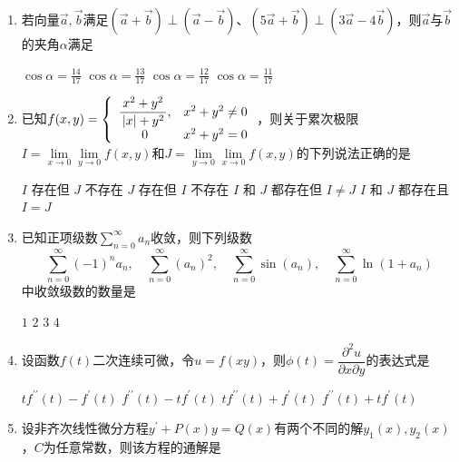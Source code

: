 \begin{enumerate}
\begin{enumerate}
\fourchoices
{$ f(x) $在$ x=-1 $连续，在$ x=1 $不连续}
{$ f(x) $在$ x=-1 $不连续，在$ x=1 $连续}
{$ f(x) $在$ x=-1 $和$ x=1 $都连续}
{$ f(x) $在$ x=-1 $和$ x=1 $都不连续}



\item 
若向量$ \vec{a},\vec{b} $满足$ (\vec{a}+\vec{b}) \perp(\vec{a}-\vec{b}) $、$ (5\vec{a}+\vec{b}) \perp (3 \vec{a}-4 \vec{b}) $，则$\vec{a}$与$\vec{b}$的夹角$  \alpha  $满足  

\fourchoices
{$\cos \alpha=\frac{14}{17}$}
{$\cos \alpha=\frac{13}{17}$}
{$\cos \alpha=\frac{12}{17}$}
{$\cos \alpha=\frac{11}{17}$}







\item 
已知$ f(x, y)=\left\{\begin{array}{cl}{\dfrac{\mathstrut x^{2}+y^{2}}{\mathstrut \left|x|+y^{2}\right.},} & {x^{2}+y^{2} \neq 0} \\ \mathstrut {0} & {x^{2}+y^{2}=0}\end{array}\right. $，则关于累次极限$ I=\lim\limits _{x \rightarrow 0} \lim\limits _{y \rightarrow 0} f(x, y) $和$ J=\lim\limits _{y \rightarrow 0 } \lim\limits_{x \rightarrow 0}f(x, y) $的下列说法正确的是  


\fourchoices
{$I$ 存在但 $J$ 不存在}
{$J$ 存在但 $I$ 不存在}
{$I$ 和 $J$ 都存在但 $I \neq J$}
{$I$ 和 $J$ 都存在且 $I=J$}



\item 
已知正项级数$ \sum\limits_{n=0}^{\infty} a_{n} $收敛，则下列级数
$$
\sum_{n=0}^{\infty}(-1)^{n} a_{n}, \quad \sum_{n=0}^{\infty}\left(a_{n}\right)^{2}, \quad  \sum_{n=0}^{\infty} \sin \left(a_{n}\right),  \quad \sum_{n=0}^{\infty} \ln \left(1+a_{n}\right)
$$
中收敛级数的数量是 


\fourchoices
{$ 1 $}
{$ 2 $}
{$ 3 $}
{$ 4 $}

\item 
设函数$ f(t) $二次连续可微，令$ u=f(xy) $，则$ \phi(t)=\dfrac{\partial^{2} u}{\partial x \partial y} $的表达式是 


\fourchoices
{$t f^{\prime \prime}(t)-f^{\prime}(t)$}
{$f^{\prime \prime}(t)-t f^{\prime}(t)$}
{$ t f^{\prime \prime}(t)+f^{\prime}(t)$}
{$ f^{\prime \prime}(t)+t f^{\prime}(t)$}


\item 
设非齐次线性微分方程$ y ^{\prime} +P(x)y=Q(x) $有两个不同的解$y_{1}(x), y_{2}(x)$，$ C $为任意常数，则该方程的通解是  



\end{enumerate}
\end{enumerate}

